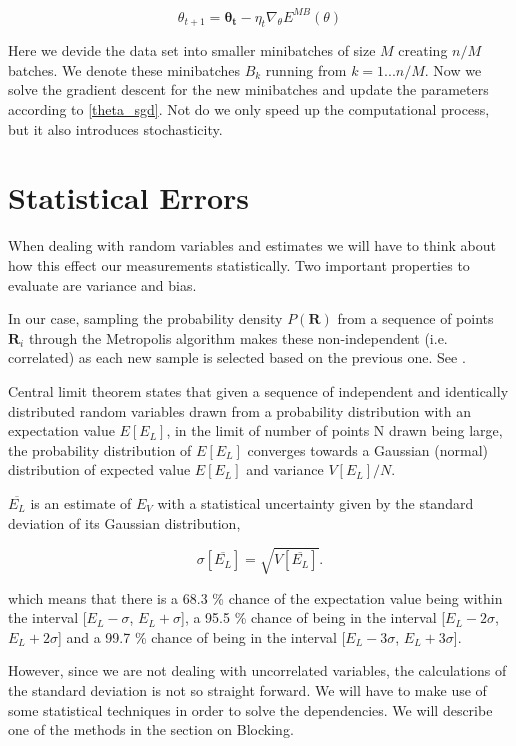 \begin{equation} \label{theta_sgd}
\theta_{t+1} = \mathbf{\theta_t} - \eta_t \nabla_{\theta} E^{MB} (\theta)
\end{equation}

Here we devide the data set into smaller minibatches of size $M$ creating $n/M$ batches. We denote these minibatches $B_k$ running from $k = 1...n/M$. Now we solve the gradient descent for the new minibatches and update the parameters according to \ref{theta_sgd}. Not do we only speed up the computational process, but it also introduces stochasticity. 

\section{Statistical Errors}

When dealing with random variables and estimates we will have to think about how this effect our measurements statistically. Two important properties to evaluate are variance and bias. 

In our case, sampling the probability density $P(\mathbf{R})$ from a sequence of points $\mathbf{R}_i$ through the Metropolis algorithm makes these non-independent (i.e. correlated) as each new sample is selected based on the previous one. See .

Central limit theorem states that given a sequence of independent and identically distributed random variables drawn from a probability distribution with an expectation value $E[E_L]$, in the limit of number of points N drawn being large, the probability distribution of $E[E_L]$ converges towards a Gaussian (normal) distribution of expected value $E[E_L]$ and variance $V[E_L]/N$.

$\overline{E_L}$ is an estimate of $E_V$ with a statistical uncertainty given by the standard deviation of its Gaussian distribution, 

\begin{equation}
\sigma[\overline{E_L}] = \sqrt{V[\overline{E_L}]}.
\end{equation}

which means that there is a 68.3 \% chance of the expectation value being within the interval [$E_L - \sigma$, $E_L + \sigma$], a 95.5 \% chance of being in the interval [$E_L - 2\sigma$, $E_L + 2\sigma$] and a 99.7 \% chance of being in the interval [$E_L - 3\sigma$, $E_L + 3\sigma$].

However, since we are not dealing with uncorrelated variables, the calculations of the standard deviation is not so straight forward. We will have to make use of some statistical techniques in order to solve the dependencies. We will describe one of the methods in the section on Blocking.

